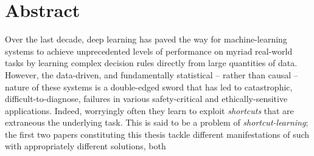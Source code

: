 \begingroup
\let\clearpage\relax
\let\cleardoublepage\relax
\let\cleardoublepage\relax

\chapter*{Abstract}
%
%
Over the last decade, deep learning has paved the way for machine-learning systems to achieve
unprecedented levels of performance on myriad real-world tasks by learning complex decision rules
directly from large quantities of data.
%
However, the data-driven, and fundamentally statistical -- rather than causal -- nature of these
systems is a double-edged sword that has led to catastrophic, difficult-to-diagnose, failures in
various safety-critical and ethically-sensitive applications.
%
%
Indeed, worryingly often they learn to exploit \emph{shortcuts} that are extraneous \wrt{} the
underlying task.
%
%
This is said to be a problem of \emph{shortcut-learning}; the first two papers constituting this
thesis tackle different manifestations of such with appropriately different solutions, both

